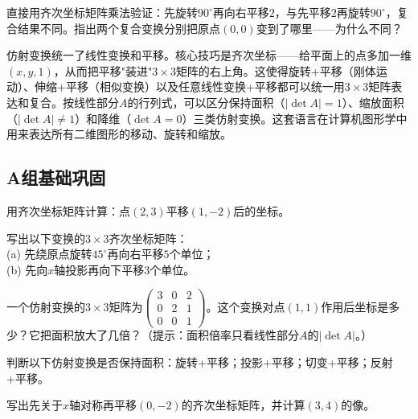 \begin{exercise}
\item 直接用齐次坐标矩阵乘法验证：先旋转$90^\circ$再向右平移$2$，与先平移$2$再旋转$90^\circ$，复合结果不同。指出两个复合变换分别把原点$(0,0)$变到了哪里——为什么不同？
\end{exercise}


仿射变换统一了线性变换和平移。核心技巧是齐次坐标——给平面上的点多加一维$(x,y,1)$，从而把平移"装进"$3\times3$矩阵的右上角。这使得旋转+平移（刚体运动）、伸缩+平移（相似变换）以及任意线性变换+平移都可以统一用$3\times3$矩阵表达和复合。按线性部分$A$的行列式，可以区分保持面积（$|\det A|=1$）、缩放面积（$|\det A|\neq1$）和降维（$\det A=0$）三类仿射变换。这套语言在计算机图形学中用来表达所有二维图形的移动、旋转和缩放。


\subsection*{A组\quad 基础巩固}
\begin{exercise}
\item 用齐次坐标矩阵计算：点$(2,3)$平移$(1,-2)$后的坐标。
\item 写出以下变换的$3\times3$齐次坐标矩阵：\\
(a) 先绕原点旋转$45^\circ$再向右平移$5$个单位；\\
(b) 先向$x$轴投影再向下平移$3$个单位。
\item 一个仿射变换的$3\times3$矩阵为$\begin{pmatrix}3&0&2\\0&2&1\\0&0&1\end{pmatrix}$。这个变换对点$(1,1)$作用后坐标是多少？它把面积放大了几倍？（提示：面积倍率只看线性部分$A$的$|\det A|$。）
\item 判断以下仿射变换是否保持面积：旋转+平移；投影+平移；切变+平移；反射+平移。
\item 写出先关于$x$轴对称再平移$(0,-2)$的齐次坐标矩阵，并计算$(3,4)$的像。
\end{exercise}

